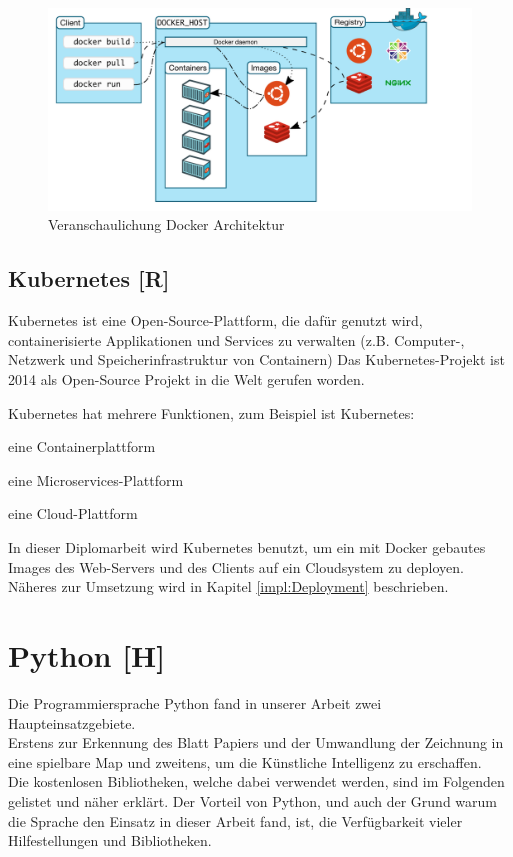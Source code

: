 \begin{figure}[H]
  \centering
  \includegraphics[scale=0.6]{pics/docker architecture.PNG}
  \caption{Veranschaulichung Docker Architektur \cite{docker_architektur}}
\end{figure}


\subsection{Kubernetes [R]}
Kubernetes ist eine Open-Source-Plattform, die dafür genutzt wird, containerisierte Applikationen und Services zu verwalten (z.B. Computer-, Netzwerk und Speicherinfrastruktur von Containern)
Das Kubernetes-Projekt ist 2014 als Open-Source Projekt in die Welt gerufen worden.

Kubernetes hat mehrere Funktionen, zum Beispiel ist Kubernetes:
\begin{compactitem}
  \item eine Containerplattform
  \item eine Microservices-Plattform
  \item eine Cloud-Plattform
\end{compactitem}
\cite{kubernetes}

In dieser Diplomarbeit wird Kubernetes benutzt, um ein mit Docker gebautes Images des Web-Servers und des Clients auf ein Cloudsystem zu deployen. Näheres zur Umsetzung wird in Kapitel \ref{impl:Deployment} beschrieben.

\newpage
\section{Python [H]}
Die Programmiersprache Python
fand in unserer Arbeit zwei Haupteinsatzgebiete. \\
Erstens zur Erkennung des Blatt Papiers und der Umwandlung der Zeichnung in eine spielbare Map
und zweitens, um die Künstliche Intelligenz zu erschaffen. \\
Die kostenlosen Bibliotheken, welche dabei verwendet werden, sind im Folgenden gelistet und näher
erklärt.
Der Vorteil von Python, und auch der Grund warum die Sprache den Einsatz in dieser Arbeit fand,
ist, die Verfügbarkeit vieler Hilfestellungen und Bibliotheken.

